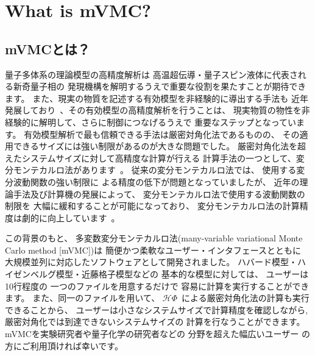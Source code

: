 \chapter{What is mVMC?}
\label{Ch:whatismVMC}
\section{mVMCとは？}
量子多体系の理論模型の高精度解析は
高温超伝導・量子スピン液体に代表される新奇量子相の
発現機構を解明するうえで重要な役割を果たすことが期待できます。
また、現実の物質を記述する有効模型を非経験的に導出する手法も
近年発展しており~\cite{ImadaMiyake}、その有効模型の高精度解析を行うことは、
現実物質の物性を非経験的に解明して、さらに制御につなげるうえで
重要なステップとなっています。
有効模型解析で最も信頼できる手法は厳密対角化法であるものの、
その適用できるサイズには強い制限があるのが大きな問題でした。
厳密対角化法を超えたシステムサイズに対して高精度な計算が行える
計算手法の一つとして、変分モンテカルロ法があります~\cite{Gros}。
従来の変分モンテカルロ法では、
使用する変分波動関数の強い制限に
よる精度の低下が問題となっていましたが、
近年の理論手法及び計算機の発展によって、
変分モンテカルロ法で使用する波動関数の制限を
大幅に緩和することが可能になっており、
変分モンテカルロ法の計算精度は劇的に向上しています~\cite{Tahara2008,Misawa2014,Morita2015}。

この背景のもと、
多変数変分モンテカルロ法(many-variable variational Monte Carlo method [mVMC])は
簡便かつ柔軟なユーザー・インタフェースとともに
大規模並列に対応したソフトウェアとして開発されました。
ハバード模型・ハイゼンベルグ模型・近藤格子模型などの
基本的な模型に対しては、
ユーザーは10行程度の
一つのファイルを用意するだけで
容易に計算を実行することができます。
また、同一のファイルを用いて、
$\mathcal{H}\Phi$~\cite{HPhi}による厳密対角化法の計算も実行できることから、
ユーザーは小さなシステムサイズで計算精度を確認しながら,
厳密対角化では到達できないシステムサイズの
計算を行なうことができます。
mVMCを実験研究者や量子化学の研究者などの
分野を超えた幅広いユーザー
の方にご利用頂ければ幸いです。

